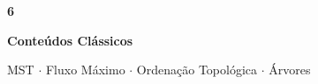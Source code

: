 \documentclass[aspectratio=169,10pt]{beamer}
\begin{document}
{
\begin{frame}[noframenumbering]
  \centering\vspace{1.2cm}
  {\fontsize{38}{46}\selectfont\bfseries\color{gemaBlue} 6}\par
  \vspace{0.25cm}
  {\Large\color{mstColor}\bfseries Conteúdos Clássicos}\par
  \vspace{0.15cm}
  {\color{gray}\small MST $\cdot$ Fluxo Máximo $\cdot$ Ordenação Topológica $\cdot$ Árvores}
\end{frame}
}

\end{document}
